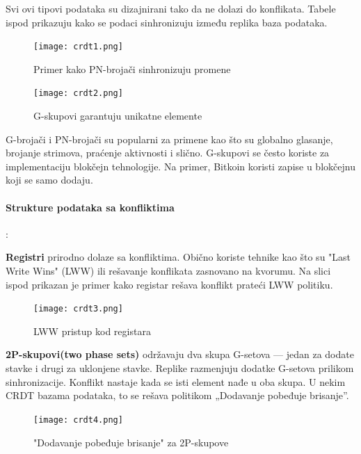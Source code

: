 \documentclass[12pt]{article}
\begin{document}
    Svi ovi tipovi podataka su dizajnirani tako da ne dolazi do konflikata. Tabele ispod prikazuju kako se podaci sinhronizuju između replika baza podataka. 

    \begin{figure}[H]
        \centering
        \texttt{[image: crdt1.png]}
        \caption{Primer kako PN-brojači sinhronizuju promene}
        \label{fig:nls_demo}
    \end{figure}

    \begin{figure}[H]
        \centering
        \texttt{[image: crdt2.png]}
        \caption{G-skupovi garantuju unikatne elemente}
        \label{fig:nls_demo}
    \end{figure}

    G-brojači i PN-brojači su popularni za primene kao što su globalno glasanje, brojanje strimova, praćenje aktivnosti i slično. G-skupovi se često koriste za implementaciju blokčejn tehnologije. Na primer, Bitkoin koristi zapise u blokčejnu koji se samo dodaju.

    \paragraph{Strukture podataka sa konfliktima}:

    \textbf{Registri} prirodno dolaze sa konfliktima. Obično koriste tehnike kao što su "Last Write Wins" (LWW) ili rešavanje konflikata zasnovano na kvorumu. Na slici ispod prikazan je primer kako registar rešava konflikt prateći LWW politiku.

    \begin{figure}[H]
        \centering
        \texttt{[image: crdt3.png]}
        \caption{LWW pristup kod registara}
        \label{fig:nls_demo}
    \end{figure}

    \textbf{2P-skupovi(two phase sets)} održavaju dva skupa G-setova — jedan za dodate stavke i drugi za uklonjene stavke. Replike razmenjuju dodatke G-setova prilikom sinhronizacije. Konflikt nastaje kada se isti element nađe u oba skupa. U nekim CRDT bazama podataka, to se rešava politikom „Dodavanje pobeđuje brisanje”.

    \begin{figure}[H]
        \centering
        \texttt{[image: crdt4.png]}
        \caption{"Dodavanje pobeđuje brisanje" za 2P-skupove}
        \label{fig:nls_demo}
    \end{figure}
\end{document}
